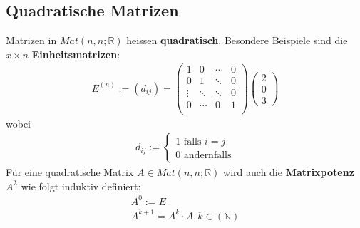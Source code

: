 \documentclass[11pt]{report}
\newcommand*\Zb[1] {\mathbb{#1}}
\newcommand*\f[1] {\textbf{#1}}
\begin{document}
\subsection{Quadratische Matrizen}
Matrizen in $Mat(n, n; \Zb{R})$ heissen \f{quadratisch}. 
Besondere Beispiele sind die $x\times n$ \f{Einheitsmatrizen}:
\begin{align}
 E^{(n)} := (d_{ij}) = \begin{pmatrix} 1 & 0 & \cdots & 0 \\
				       0 & 1 & \ddots & 0 \\
				       \vdots & \ddots & \ddots & 0 \\
				       0 & \cdots & 0 & 1 \\
\end{pmatrix}\begin{pmatrix} 2 \\ 0 \\ 3 \end{pmatrix}
\end{align}
wobei 
\begin{align}
d_{ij} := \left\{ \begin{matrix} 1 \text{ falls } i=j \\ 0 \text{ andernfalls} \end{matrix}\right.
\end{align}
Für eine quadratische Matrix $A \in Mat(n, n;\Zb{R})$ wird auch die \f{Matrixpotenz} $A^{\lambda}$ wie folgt induktiv definiert:
\begin{align}
 A^{0} := E \\
 A^{k+1} = A^{k} \cdot A, k \in (\Zb{N})
\end{align}
\end{document}
